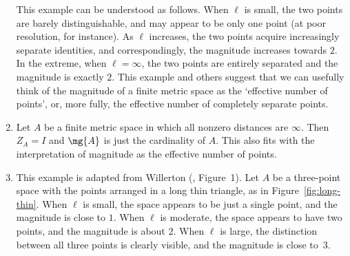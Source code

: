 \begin{examples}
\begin{enumerate}
This example can be understood as follows.  When $\ell$ is small, the two
points are barely distinguishable, and may appear to be only one point (at
poor resolution, for instance).  As $\ell$ increases, the two points
acquire increasingly separate identities, and correspondingly, the
magnitude increases towards $2$.  In the extreme, when $\ell = \infty$, the
two points are entirely separated and the magnitude is exactly $2$.  This
example and others suggest that we can usefully think of the magnitude of a
finite metric space as the `effective%
%
%
number of points', or, more fully, the effective number of
completely separate points.

\item
Let $A$ be a finite metric space in which all nonzero distances are
$\infty$.  Then $Z_A = I$ and $\mg{A}$ is just the cardinality of $A$.
This also fits with the interpretation of magnitude as the effective number
of points. 

\item
{}
This example is adapted from Willerton (\cite{WillSMS},%
%
% 
Figure~1).  Let $A$ be a three-point space with the points arranged in a long
thin triangle, as in Figure~\ref{fig:long-thin}.  When $\ell$ is small, the
space appears to be just a single point, and the magnitude is close to $1$.
When $\ell$ is moderate, the space appears to have two points, and the
magnitude is about $2$.  When $\ell$ is large, the distinction between all
three points is clearly visible, and the magnitude is close to~$3$.


\end{enumerate}
\end{examples}

